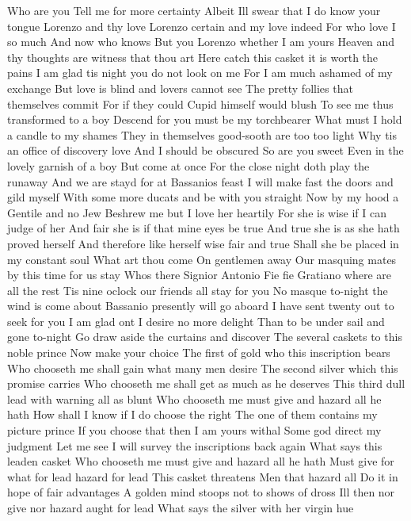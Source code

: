 Who are you Tell me for more certainty 
Albeit Ill swear that I do know your tongue 
Lorenzo and thy love 
Lorenzo certain and my love indeed 
For who love I so much And now who knows 
But you Lorenzo whether I am yours 
Heaven and thy thoughts are witness that thou art 
Here catch this casket it is worth the pains 
I am glad tis night you do not look on me 
For I am much ashamed of my exchange 
But love is blind and lovers cannot see 
The pretty follies that themselves commit 
For if they could Cupid himself would blush 
To see me thus transformed to a boy 
Descend for you must be my torchbearer 
What must I hold a candle to my shames 
They in themselves good-sooth are too too light 
Why tis an office of discovery love 
And I should be obscured 
So are you sweet 
Even in the lovely garnish of a boy 
But come at once 
For the close night doth play the runaway 
And we are stayd for at Bassanios feast 
I will make fast the doors and gild myself 
With some more ducats and be with you straight 
Now by my hood a Gentile and no Jew 
Beshrew me but I love her heartily 
For she is wise if I can judge of her 
And fair she is if that mine eyes be true 
And true she is as she hath proved herself 
And therefore like herself wise fair and true 
Shall she be placed in my constant soul 
What art thou come On gentlemen away 
Our masquing mates by this time for us stay 
Whos there 
Signior Antonio 
Fie fie Gratiano where are all the rest 
Tis nine oclock our friends all stay for you 
No masque to-night the wind is come about 
Bassanio presently will go aboard 
I have sent twenty out to seek for you 
I am glad ont I desire no more delight 
Than to be under sail and gone to-night 
Go draw aside the curtains and discover 
The several caskets to this noble prince 
Now make your choice 
The first of gold who this inscription bears 
Who chooseth me shall gain what many men desire 
The second silver which this promise carries 
Who chooseth me shall get as much as he deserves 
This third dull lead with warning all as blunt 
Who chooseth me must give and hazard all he hath 
How shall I know if I do choose the right 
The one of them contains my picture prince 
If you choose that then I am yours withal 
Some god direct my judgment Let me see 
I will survey the inscriptions back again 
What says this leaden casket 
Who chooseth me must give and hazard all he hath 
Must give for what for lead hazard for lead 
This casket threatens Men that hazard all 
Do it in hope of fair advantages 
A golden mind stoops not to shows of dross 
Ill then nor give nor hazard aught for lead 
What says the silver with her virgin hue 
